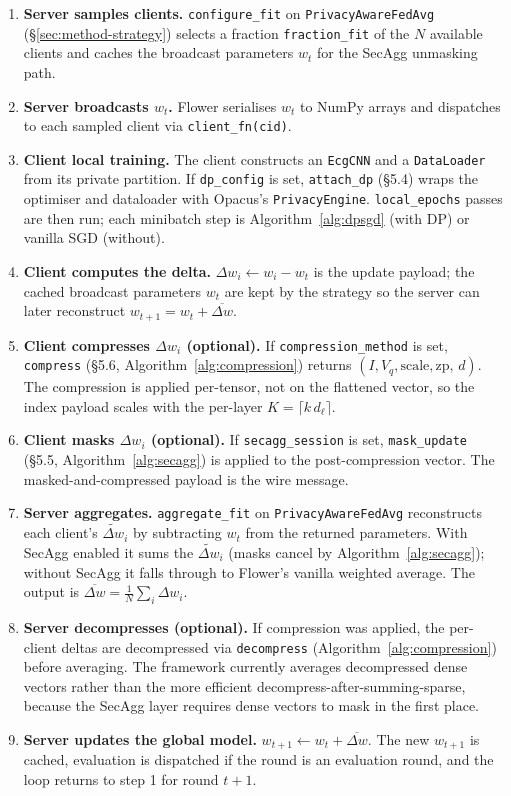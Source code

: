 \documentclass[11pt,a4paper]{report}
\begin{document}
\begin{enumerate}[leftmargin=*]
  \item \textbf{Server samples clients.} \texttt{configure\_fit} on
  \texttt{PrivacyAwareFedAvg} (\S\ref{sec:method-strategy}) selects a
  fraction \texttt{fraction\_fit} of the $N$ available clients and caches
  the broadcast parameters $w_t$ for the SecAgg unmasking path.
  \item \textbf{Server broadcasts $w_t$.} Flower serialises $w_t$ to
  NumPy arrays and dispatches to each sampled client via
  \texttt{client\_fn(cid)}.
  \item \textbf{Client local training.} The client constructs an
  \texttt{EcgCNN} and a \texttt{DataLoader} from its private partition.
  If \texttt{dp\_config} is set, \texttt{attach\_dp} (\S5.4) wraps the
  optimiser and dataloader with Opacus's \texttt{PrivacyEngine}.
  \texttt{local\_epochs} passes are then run; each minibatch step is
  Algorithm~\ref{alg:dpsgd} (with DP) or vanilla SGD (without).
  \item \textbf{Client computes the delta.} $\Delta w_i \gets w_i - w_t$
  is the update payload; the cached broadcast parameters $w_t$ are kept
  by the strategy so the server can later reconstruct $w_{t+1} = w_t +
  \overline{\Delta w}$.
  \item \textbf{Client compresses $\Delta w_i$ (optional).} If
  \texttt{compression\_method} is set, \texttt{compress} (\S5.6,
  Algorithm~\ref{alg:compression}) returns
  $(I, V_q, \mathrm{scale}, \mathrm{zp},\, d)$. The compression is
  applied per-tensor, not on the flattened vector, so the index payload
  scales with the per-layer $K = \lceil k\,d_\ell \rceil$.
  \item \textbf{Client masks $\Delta w_i$ (optional).} If
  \texttt{secagg\_session} is set, \texttt{mask\_update} (\S5.5,
  Algorithm~\ref{alg:secagg}) is applied to the post-compression
  vector. The masked-and-compressed payload is the wire message.
  \item \textbf{Server aggregates.} \texttt{aggregate\_fit} on
  \texttt{PrivacyAwareFedAvg} reconstructs each client's
  $\tilde{\Delta w}_i$ by subtracting $w_t$ from the returned parameters.
  With SecAgg enabled it sums the $\tilde{\Delta w}_i$ (masks cancel by
  Algorithm~\ref{alg:secagg}); without SecAgg it falls through to
  Flower's vanilla weighted average. The output is
  $\overline{\Delta w} = \tfrac{1}{N}\sum_i \Delta w_i$.
  \item \textbf{Server decompresses (optional).} If compression was
  applied, the per-client deltas are decompressed via
  \texttt{decompress} (Algorithm~\ref{alg:compression}) before
  averaging. The framework currently averages decompressed dense
  vectors rather than the more efficient
  decompress-after-summing-sparse, because the SecAgg layer requires
  dense vectors to mask in the first place.
  \item \textbf{Server updates the global model.}
  $w_{t+1} \gets w_t + \overline{\Delta w}$. The new $w_{t+1}$ is
  cached, evaluation is dispatched if the round is an
  evaluation round, and the loop returns to step 1 for round $t+1$.
\end{enumerate}
\end{document}
